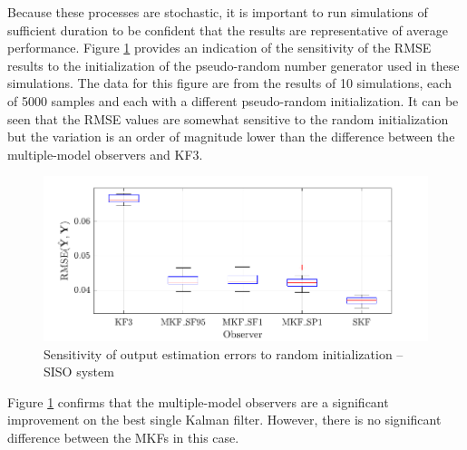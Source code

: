 Because these processes are stochastic, it is important to run simulations of sufficient duration to be confident that the results are representative of average performance. Figure \ref{fig:rod-obs-sim1-yest-all-seed-RMSE-box} provides an indication of the sensitivity of the \gls{RMSE} results to the initialization of the pseudo-random number generator used in these simulations. The data for this figure are from the results of 10 simulations, each of 5000 samples and each with a different pseudo-random initialization. It can be seen that the \gls{RMSE} values are somewhat sensitive to the random initialization but the variation is an order of magnitude lower than the difference between the multiple-model observers and KF3.
\begin{figure}[htp]
	\centering
	\includegraphics[width=12cm]{images/rod_obs_sim1_all_seed_y_err_box.pdf}
	\caption{Sensitivity of output estimation errors to random initialization – SISO system}
	\label{fig:rod-obs-sim1-yest-all-seed-RMSE-box}
\end{figure}
Figure \ref{fig:rod-obs-sim1-yest-all-seed-RMSE-box} confirms that the multiple-model observers are a significant improvement on the best single Kalman filter. However, there is no significant difference between the MKFs in this case.
%
%
%

